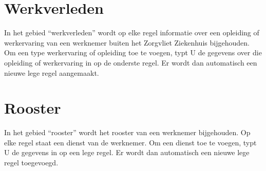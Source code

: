
\section{Werkverleden} \label{sec:werkverleden}
    In het gebied ``werkverleden'' wordt op elke regel informatie over een
    opleiding of werkervaring van een werknemer buiten het Zorgvliet Ziekenhuis bijgehouden.
    Om een type werkervaring of opleiding toe te voegen, typt U de
    gegevens over die opleiding of werkervaring in op de onderste
    regel. Er wordt dan automatisch een nieuwe lege regel aangemaakt.


\section{Rooster} \label{sec:rooster}
    In het gebied ``rooster'' wordt het rooster van een
    werknemer bijgehouden. Op elke regel staat een dienst van de
    werknemer. Om een dienst toe te voegen, typt U de gegevens in op een lege
    regel. Er wordt dan automatisch een nieuwe lege regel toegevoegd.

